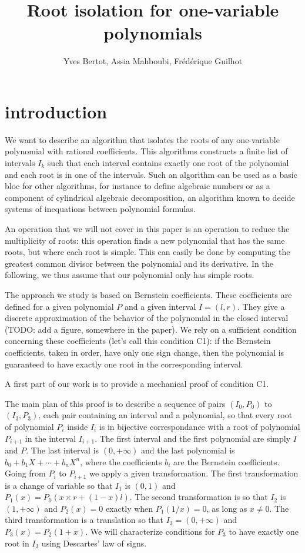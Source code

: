 \documentclass{article}
\begin{document}
\title{Root isolation for one-variable polynomials}
\author{Yves Bertot, Assia Mahboubi, Fr\'ed\'erique Guilhot}

\maketitle

\section{introduction}
We want to describe an algorithm that isolates the roots of any
one-variable polynomial with rational coefficients.  This algorithms
constructs a finite list of intervals \(I_k\) such that each interval
contains exactly one root of the polynomial and each root is in one of
the intervals.  Such an algorithm can be used as a basic bloc for
other algorithms, for instance to define algebraic numbers or as a
component of cylindrical algebraic decomposition, an algorithm known
to decide systems of inequations between polynomial formulas.

An operation that we will not cover in this paper is an operation
 to reduce the multiplicity of roots: this operation finds a new
polynomial that has the same roots, but where each root is simple.
This can easily be done by computing the greatest
common divisor between the polynomial and its derivative.  In the
following, we thus assume that our polynomial only has simple roots.

The approach we study is based on Bernstein coefficients.  These
coefficients are defined for a given polynomial \(P\) and a given
interval \(I=(l,r)\).  They give a discrete approximation of the behavior of
the polynomial in the closed interval ({\sf TODO: add a figure, somewhere
in the paper}).  We rely on a sufficient
condition concerning these coefficients (let's call this condition
C1): if the Bernstein coefficients, taken in order, have only one
sign change, then the polynomial is guaranteed to have exactly one
root in the corresponding interval.

A first part of our work is to provide a mechanical proof of condition C1.

The main plan of this proof is to describe a sequence of pairs
\((I_0, P_0)\) to \((I_3, P_3)\), each pair containing an interval
and a polynomial, so that every root of polynomial \(P_i\) inside
\(I_i\) is in bijective correspondance with a root of polynomial \(P_{i+1}\)
in the interval \(I_{i+1}\).  The first interval and the first polynomial
are simply \(I\) and \(P\).  The last interval is \((0, +\infty)\) and
the last polynomial is \(b_0 + b_1 X + \cdots + b_n X^n\), where
the coefficients \(b_i\) are the Bernstein coefficients.  Going from
\(P_i\) to \(P_{i+1}\) we apply a given transformation.  The first 
transformation is a change of variable so that \(I_1\) is \((0,1)\) and
\(P_1(x) = P_0(x \times r + (1 - x) l)\).  The second transformation is so
that \(I_2\) is \((1,+\infty)\) and \(P_2(x) = 0\) exactly when
\(P_1(1/x) = 0\), as long as \(x\neq 0\).  The third transformation is a
translation so that \(I_3 = (0,+\infty)\) and \(P_3(x) = P_2(1+x)\).  
We will characterize conditions for \(P_3\) to have exactly one root in
\(I_3\) using Descartes' law of signs.
\end{document}
